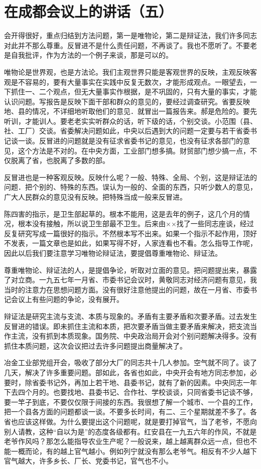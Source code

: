 \section[在成都会议上的讲话（五）（一九五九年三月二十五日）]{在成都会议上的讲话（五）}


会开得很好，重点归结到方法问题，第一是唯物论，第二是辩证法，我们许多同志对此并不那么尊重。反冒进不是什么责任问题，不再谈了。我也不愿听了。不要老是自我批评，作为方法的一个例子来谈，那是可以的。

唯物论是世界观，也是方法论。我们主观世界只能是客观世界的反映，主观反映客观是不容易的，要有大量事实在实践中反复无数次，才能形成观点。一眼望去，一下抓住一、二个观点，但无大量事实作根据，是不巩固的，只有大量的事实，才能认识问题。写报告是反映下面干部和群众的意见的，要经过调查研究。省要反映地、县的情况，不详细地听取他们的意见．就冒出一篇报告来。郝是危险的。要先听训，才能训人。要老老实实听群众的话，听下级的话，个别交谈。小范围（县、社、工厂）交谈。省委解决问题如此，中央以后遇到大的问题一定要与若干省委书记谈一谈。反冒进的问题就是没有征求省委书记的意见，也没有征求各部门的意见，这个方法是不对的。在中央方面，工业部门想多搞。财贸部门想少搞一点，不仅脱离了省，也脱离了多数的部。


反冒进也是一种客观反映。反映什么呢？一般、特殊、全局、个别，这是辩证法的问题．把个别的、特殊的东西。误认为一般的、全面的东西，只听少数人的意见，广大人民群众的意见没有反映。把特殊当成一般来反冒进。

陈四害的指示，是卫生部起草的。根本不能用，这是去年的例子，这几个月的情况，根本没有接触，所以说卫生部最不卫生。后来由××找了一些同志座谈，经过反复研究写成一篇很好的指示。不然根本写不出来。如果一个指示不起作用，顶好不发表，一篇文章也是如此，如果写得不好，人家连看也不看。怎么指导工作呢，因此以后我们要注意学习唯物论辩证法，要提倡尊重唯物论、辩证法。

尊重唯物论、辩证法的人，是提倡争论，听取对立面的意见。把问题提出来，暴露了对立商。一九五七年一月省、市委书记会议时，黄敬同志对经济问题有意见，我当时的注意力在思想问题方面。没有很好注意他提出的问题，故在一月省、市委书记会议上有些问题的争论，没有展开。

辩证法是研究主流与支流、本质与现象的。矛盾有主要矛盾和次要矛盾。过去发生反冒进的错误。即未抓住主流和本质，把次要矛盾当做主要矛盾来解决，把支流当作主流，没有抓到本质现象。国务院、中央政治局开会对个别问题解决得多。没有抓住本质问题，这次会议把过去许多问题提出商量解决了。

冶金工业部党组开会，吸收了部分大厂的同志共十几人参加。空气就不同了。谈了几天，解决了许多重要问题。部如此，各省也如此，中央开会有地方同志参加，必要时，除省委书记外，再加上若干地、县委书记，就有了新的因素。中央同志一年下去四个月的。也要找地、县委书记、合作社、学校谈谈，只同省委书记谈不够，要一竿子到底，不要仅仅限于间接的东西。我很想了解一个城市、一个县的工作，把一个县各方面的问题都谈一谈。不要多长时间，有二、三个星期就差不多了。各省也应该这样做。为什么要提出这个问题呢，就是要打掉官气，当了老爷，不愿向别人请教，这种“自以为是”的态度各级都有。红安县在一九五六年的作风，不就是老爷作风吗？那怎么能指导农业生产呢？一般说来，越上越离群众远一点，但也不能一概而论，有的越上官气越小。例如列宁就没有那么老爷气。相反有不少人越下官气越大，许多乡长、厂长、党委书记，官气也不小。

